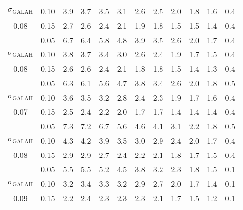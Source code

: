 \begin{tabular}{cccccccccccc}
$\sigma_\mathrm{GALAH}$ & 0.10 & 3.9 & 3.7 & 3.5 & 3.1 & 2.6 & 2.5 & 2.0 & 1.8 & 1.6 & 0.4 \\
0.08 & 0.15 & 2.7 & 2.6 & 2.4 & 2.1 & 1.9 & 1.8 & 1.5 & 1.5 & 1.4 & 0.4 \\
\hline
[Mn/H] & 0.05 & 6.7 & 6.4 & 5.8 & 4.8 & 3.9 & 3.5 & 2.6 & 2.0 & 1.7 & 0.4 \\
$\sigma_\mathrm{GALAH}$ & 0.10 & 3.8 & 3.7 & 3.4 & 3.0 & 2.6 & 2.4 & 1.9 & 1.7 & 1.5 & 0.4 \\
0.08 & 0.15 & 2.6 & 2.6 & 2.4 & 2.1 & 1.8 & 1.8 & 1.5 & 1.4 & 1.3 & 0.4 \\
\hline
[Fe/H] & 0.05 & 6.3 & 6.1 & 5.6 & 4.7 & 3.8 & 3.4 & 2.6 & 2.0 & 1.8 & 0.5 \\
$\sigma_\mathrm{GALAH}$ & 0.10 & 3.6 & 3.5 & 3.2 & 2.8 & 2.4 & 2.3 & 1.9 & 1.7 & 1.6 & 0.4 \\
0.07 & 0.15 & 2.5 & 2.4 & 2.2 & 2.0 & 1.7 & 1.7 & 1.4 & 1.4 & 1.4 & 0.4 \\
\hline
[Co/H] & 0.05 & 7.3 & 7.2 & 6.7 & 5.6 & 4.6 & 4.1 & 3.1 & 2.2 & 1.8 & 0.5 \\
$\sigma_\mathrm{GALAH}$ & 0.10 & 4.3 & 4.2 & 3.9 & 3.5 & 3.0 & 2.9 & 2.4 & 2.0 & 1.7 & 0.4 \\
0.08 & 0.15 & 2.9 & 2.9 & 2.7 & 2.4 & 2.2 & 2.1 & 1.8 & 1.7 & 1.5 & 0.4 \\
\hline
[Ba/H] & 0.05 & 5.5 & 5.5 & 5.2 & 4.5 & 3.8 & 3.2 & 2.3 & 1.8 & 1.5 & 0.1 \\
$\sigma_\mathrm{GALAH}$ & 0.10 & 3.2 & 3.4 & 3.3 & 3.2 & 2.9 & 2.7 & 2.0 & 1.7 & 1.4 & 0.1 \\
0.09 & 0.15 & 2.2 & 2.4 & 2.3 & 2.3 & 2.3 & 2.1 & 1.7 & 1.5 & 1.2 & 0.1 \\
\hline
\hline
\end{tabular}
